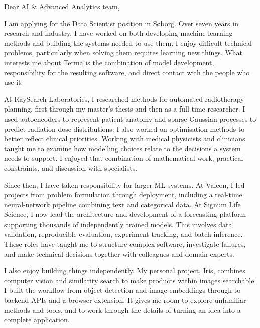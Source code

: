 \documentclass[11pt,a4paper]{moderncv}
\begin{document}
\makecvtitle
Dear AI \& Advanced Analytics team,

\vspace*{2em}
I am applying for the Data Scientist position in S\o borg. Over seven years in research and industry, I have worked on both developing machine-learning methods and building the systems needed to use them. I enjoy difficult technical problems, particularly when solving them requires learning new things. What interests me about Terma is the combination of model development, responsibility for the resulting software, and direct contact with the people who use it.

\vspace{4pt}
\hspace*{2em}
At RaySearch Laboratories, I researched methods for automated radiotherapy planning, first through my master's thesis and then as a full-time researcher. I used autoencoders to represent patient anatomy and sparse Gaussian processes to predict radiation dose distributions. I also worked on optimisation methods to better reflect clinical priorities. Working with medical physicists and clinicians taught me to examine how modelling choices relate to the decisions a system needs to support. I enjoyed that combination of mathematical work, practical constraints, and discussion with specialists.

\vspace{4pt}
\hspace*{2em}
Since then, I have taken responsibility for larger ML systems. At Valcon, I led projects from problem formulation through deployment, including a real-time neural-network pipeline combining text and categorical data. At Signum Life Science, I now lead the architecture and development of a forecasting platform supporting thousands of independently trained models. This involves data validation, reproducible evaluation, experiment tracking, and batch inference. These roles have taught me to structure complex software, investigate failures, and make technical decisions together with colleagues and domain experts.

\vspace{4pt}
\hspace*{2em}
I also enjoy building things independently. My personal project, \href{https://github.com/ivar-cashin-eriksson/iris}{Iris}, combines computer vision and similarity search to make products within images searchable. I built the workflow from object detection and image embeddings through to backend APIs and a browser extension. It gives me room to explore unfamiliar methods and tools, and to work through the details of turning an idea into a complete application.
\end{document}
